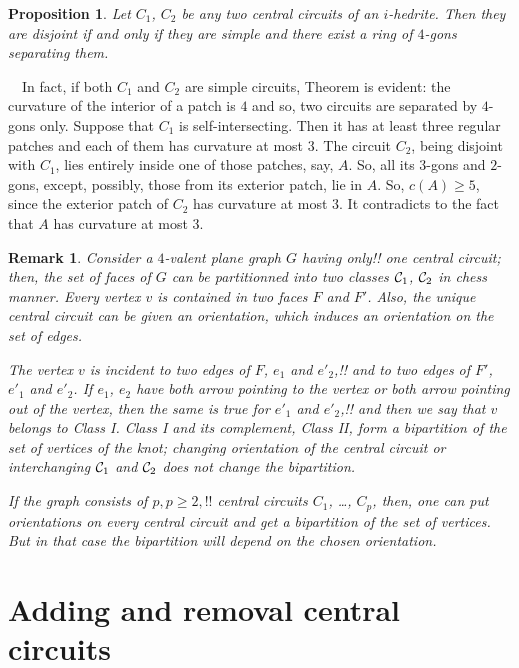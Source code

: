 \documentclass[12pt]{article}
\newtheorem{proposition}{Proposition}
\newtheorem{remark}{Remark}
\newcommand{\proof}{\noindent{\bf Proof.}\ \ }
\begin{document}
\begin{proposition}\label{intersec}
Let $C_1$, $C_2$ be any two central circuits of an $i$-hedrite. Then 
they are disjoint if and only if they are simple and there exist a 
ring of $4$-gons separating them.

\end{proposition}
\proof In fact, if both $C_1$ and $C_2$ are simple circuits, Theorem 
is evident: the curvature of the interior of a patch is $4$ and so, two
circuits are separated by $4$-gons only. Suppose that $C_1$ is 
self-intersecting. Then it has at least three regular patches and each 
of them has curvature at most $3$.
The circuit $C_2$, being disjoint with $C_1$, lies entirely inside one 
of those patches, say, $A$. So, all its $3$-gons and $2$-gons, except, 
possibly, those from its exterior patch, lie in $A$. So, $c(A)\geq 5$,
since the exterior patch of $C_2$ has curvature at most $3$.
It contradicts to the fact that $A$ has curvature at most $3$. 


\begin{remark}
Consider a $4$-valent plane graph $G$ having only!! one central circuit;
then, the set of faces of $G$ can be partitionned into two classes
${\cal C}_1$, ${\cal C}_2$ in chess manner. Every vertex $v$ is 
contained in two faces $F$ and $F'$. Also, the unique central circuit 
can be given an orientation, which induces an orientation on the set
of edges.

The vertex $v$ is incident to two edges of $F$, $e_1$ and $e'_2$,!! 
and to two edges of $F'$, $e'_1$ and $e'_2$. If $e_1$, $e_2$ 
have both arrow pointing {\em to} the vertex or both arrow pointing {\em out} 
of the vertex, then the same is true for $e'_1$ and $e'_2$,!! and then
we say that $v$ {\em belongs to Class I}.
Class I and its complement, Class II, form a bipartition of the
set of vertices of the knot; changing orientation of the central
circuit or interchanging ${\cal C}_1$ and ${\cal C}_2$ does not 
change the bipartition. 

If the graph consists of $p, p \ge 2,!!$ central circuits $C_1$, \dots, $C_p$,
then, one can put orientations on every central circuit and get
a bipartition of the set of vertices. But in that case the 
bipartition will depend on the chosen orientation.
\end{remark}


\section{Adding and removal central circuits}
\end{document}
